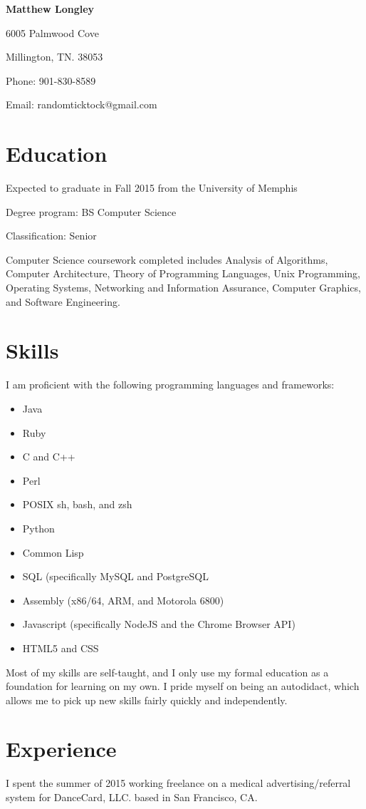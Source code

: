 \documentclass{article}
\begin{document}
\begin{singlespace}
\begin{center}
  \textbf{Matthew Longley}
  
  6005 Palmwood Cove
  
  Millington, TN. 38053
  
  Phone: 901-830-8589
  
  Email: randomticktock@gmail.com
\end{center}
\begin{flushleft}
  \section*{Education}
  Expected to graduate in Fall 2015 from the University of Memphis

  Degree program: BS Computer Science

  Classification: Senior

  Computer Science coursework completed includes Analysis of Algorithms, Computer Architecture, Theory of Programming Languages, Unix Programming, Operating Systems, Networking and Information Assurance, Computer Graphics, and Software Engineering.
  \section*{Skills}
  I am proficient with the following programming languages and frameworks:
  \begin{itemize}
  \item Java
  \item Ruby
  \item C and C++
  \item Perl
  \item POSIX sh, bash, and zsh
  \item Python
  \item Common Lisp
  \item SQL (specifically MySQL and PostgreSQL
  \item Assembly (x86/64, ARM, and Motorola 6800)
  \item Javascript (specifically NodeJS and the Chrome Browser API)
  \item HTML5 and CSS
  \end{itemize}
  Most of my skills are self-taught, and I only use my formal education as a foundation for learning on my own. I pride myself on being an autodidact, which allows me to pick up new skills fairly quickly and independently.
  \section*{Experience}
  I spent the summer of 2015 working freelance on a medical advertising/referral system for DanceCard, LLC. based in San Francisco, CA.
\end{flushleft}
\end{singlespace}
\end{document}
